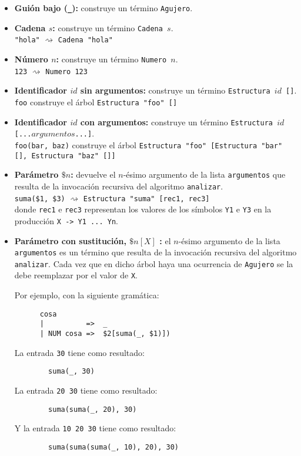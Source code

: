 \documentclass{article}
\begin{document}
\begin{itemize}
\item {\bf Gui\'on bajo (\verb|_|):} construye un t\'ermino \texttt{Agujero}.
\item {\bf Cadena $s$:} construye un t\'ermino \texttt{Cadena $s$}.\\
      \verb|"hola"| $\rightsquigarrow$ \verb|Cadena "hola"|
\item {\bf N\'umero $n$:} construye un t\'ermino \texttt{Numero $n$}.\\
      \verb|123| $\rightsquigarrow$ \verb|Numero 123|
\item {\bf Identificador $id$ sin argumentos:} construye un t\'ermino \texttt{Estructura $id$ []}.\\
      \verb|foo| construye el \'arbol \verb|Estructura "foo" []|
\item {\bf Identificador $id$ con argumentos:} construye un t\'ermino \texttt{Estructura $id$ [...$argumentos$...]}.\\
      \verb|foo(bar, baz)| construye el \'arbol \verb|Estructura "foo" [Estructura "bar" [], Estructura "baz" []]|
\item {\bf Par\'ametro $\$n$:} devuelve el $n$-\'esimo argumento de la lista \texttt{argumentos} que resulta de la invocaci\'on 
      recursiva del algoritmo \texttt{analizar}.\\
      \verb|suma($1, $3)| $\rightsquigarrow$ \verb|Estructura "suma" [rec1, rec3]|\\
      donde \texttt{rec1} e \texttt{rec3} representan los valores de los s\'imbolos \texttt{Y1} e \texttt{Y3} en la producci\'on \verb|X -> Y1 ... Yn|.
\item {\bf Par\'ametro con sustituci\'on, $\$n[X]$ :}
      el $n$-\'esimo argumento de la lista \texttt{argumentos} es un t\'ermino
      que resulta de la invocaci\'on recursiva del algoritmo \texttt{analizar}.
      Cada vez que en dicho \'arbol haya una ocurrencia de \texttt{Agujero}
      se la debe reemplazar por el valor de \texttt{X}.

      Por ejemplo, con la siguiente gram\'atica:
      \begin{verbatim}
      cosa
      |          =>  _
      | NUM cosa =>  $2[suma(_, $1)])
      \end{verbatim}
      La entrada \verb|30| tiene como resultado:
      \begin{verbatim}
        suma(_, 30)
      \end{verbatim}
      La entrada \verb|20 30| tiene como resultado:
      \begin{verbatim}
        suma(suma(_, 20), 30)
      \end{verbatim}
      Y la entrada \verb|10 20 30| tiene como resultado:
      \begin{verbatim}
        suma(suma(suma(_, 10), 20), 30)
      \end{verbatim}
\end{itemize}
\end{document}
